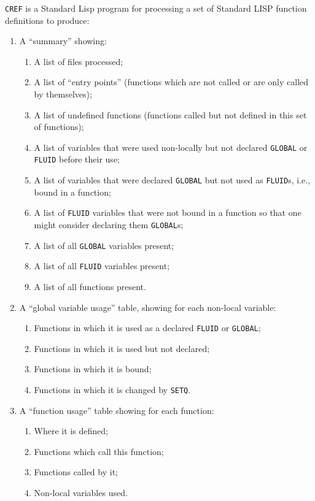 \texttt{CREF} is a Standard Lisp program for processing a
set of Standard LISP function definitions to produce:
\begin{enumerate}
\item A ``summary'' showing:
\begin{enumerate}
\item A list of files processed;
\item A list of ``entry points'' (functions which are not called or
are only called by themselves);
\item A list of undefined functions (functions called but not
defined in this set of functions);
\item A list of variables that were used non-locally but not
declared \texttt{GLOBAL} or \texttt{FLUID} before their use;
\item A list of variables that were declared \texttt{GLOBAL} but not used
as \texttt{FLUID}s, i.e., bound in a function;
\item A list of \texttt{FLUID} variables that were not bound in a function
so that one might consider declaring them \texttt{GLOBAL}s;
\item A list of all \texttt{GLOBAL} variables present;
\item A list of all \texttt{FLUID} variables present;
\item A list of all functions present.
\end{enumerate}
\item A ``global variable usage'' table, showing for each non-local
   variable:
\begin{enumerate}
\item Functions in which it is used as a declared \texttt{FLUID} or \texttt{GLOBAL};
\item Functions in which it is used but not declared;
\item Functions in which it is bound;
\item Functions in which it is changed by \texttt{SETQ}.
\end{enumerate}
\item A ``function usage'' table showing for each function:
\begin{enumerate}
\item Where it is defined;
\item Functions which call this function;
\item Functions called by it;
\item Non-local variables used.
\end{enumerate}
\end{enumerate}

